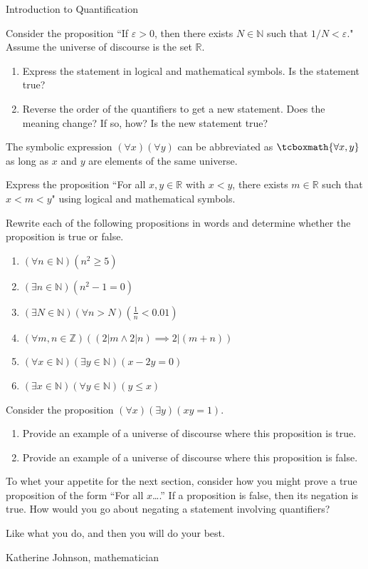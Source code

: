 \begin{section}{Introduction to Quantification}
\begin{problem}
Consider the proposition ``If $\varepsilon >0$, then there exists $N\in\mathbb{N}$ such that $1/N<\varepsilon$."  Assume the universe of discourse is the set $\mathbb{R}$.
\begin{enumerate}[label=\textrm{(\alph*)}]
\item Express the statement in logical and mathematical symbols. Is the statement true?
\item Reverse the order of the quantifiers to get a new statement. Does the meaning change?  If so, how?  Is the new statement true?
\end{enumerate}
\end{problem}

The symbolic expression $(\forall x)(\forall y)$ can be abbreviated as $\tcboxmath{\forall x,y}$ as long as $x$ and $y$ are elements of the same universe.

\begin{problem}
Express the proposition ``For all $x,y\in\mathbb{R}$ with $x<y$, there exists $m\in\mathbb{R}$ such that $x<m<y$" using logical and mathematical symbols.
\end{problem}

\begin{problem}
Rewrite each of the following propositions in words and determine whether the proposition is true or false.
\begin{enumerate}[label=\textrm{(\alph*)}]
\item $(\forall n \in \mathbb{N})(n^2 \geq 5)$
\item $(\exists n \in \mathbb{N})(n^2-1=0)$
\item $(\exists N \in \mathbb{N})(\forall  n > N)(\frac{1}{n} < 0.01)$
\item $(\forall m, n \in \mathbb{Z})((2|m \wedge 2|n) \implies 2|(m+n))$
\item $(\forall x \in \mathbb{N})(\exists y \in \mathbb{N})(x-2y=0)$
\item $(\exists x \in \mathbb{N})(\forall y \in \mathbb{N})(y \leq x)$
\end{enumerate}
\end{problem}

\begin{problem}
Consider the proposition $(\forall x)(\exists y)(xy=1)$.
\begin{enumerate}[label=\textrm{(\alph*)}]
\item Provide an example of a universe of discourse where this proposition is true.
\item Provide an example of a universe of discourse where this proposition is false.
\end{enumerate}
\end{problem}

To whet your appetite for the next section, consider how you might prove a true proposition of the form ``For all $x$\ldots.'' If a proposition is false, then its negation is true. How would you go about negating a statement involving quantifiers? 

\epigraph{Like what you do, and then you will do your best.}{Katherine Johnson, mathematician}

\end{section}